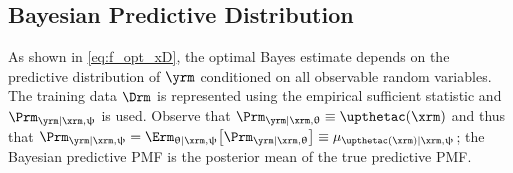 \documentclass{article}
\begin{document}
	
	
	
	
	
	
	
	
	\subsection{Bayesian Predictive Distribution}
	
	As shown in \eqref{eq:f_opt_xD}, the optimal Bayes estimate depends on the predictive distribution of $\yrm$ conditioned on all observable random variables. The training data $\Drm$ is represented using the empirical sufficient statistic and $\Prm_{\yrm | \xrm,\uppsi}$ is used. Observe that $\Prm_{\yrm | \xrm,\uptheta} \equiv \upthetac(\xrm)$ and thus that $\Prm_{\yrm | \xrm,\uppsi} = \Erm_{\uptheta | \xrm,\uppsi}\big[ \Prm_{\yrm | \xrm,\uptheta} \big] \equiv \mu_{\upthetac(\xrm) | \xrm,\uppsi}$; the Bayesian predictive PMF is the posterior mean \cite{murphy} of the true predictive PMF.
	
\end{document}
